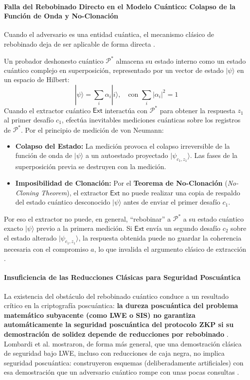 \paragraph{Falla del Rebobinado Directo en el Modelo Cuántico: Colapso de la Función de Onda y No-Clonación}
Cuando el adversario es una entidad cuántica, el mecanismo clásico de rebobinado deja de ser aplicable de forma directa \cite{liu2019revisiting}.

Un probador deshonesto cuántico $\mathcal{P}^*$ almacena su estado interno como un estado cuántico complejo en superposición, representado por un vector de estado $|\psi\rangle$ en un espacio de Hilbert:
\begin{equation}
|\psi\rangle = \sum_{i} \alpha_i |i\rangle, \quad \text{con } \sum_{i} |\alpha_i|^2 = 1
\end{equation}
Cuando el extractor cuántico $\mathsf{Ext}$ interactúa con $\mathcal{P}^*$ para obtener la respuesta $z_1$ al primer desafío $c_1$, efectúa inevitables mediciones cuánticas sobre los registros de $\mathcal{P}^*$. Por el principio de medición de von Neumann:
\begin{itemize}
    \item \textbf{Colapso del Estado:} La medición provoca el colapso irreversible de la función de onda de $|\psi\rangle$ a un autoestado proyectado $|\psi_{c_1, z_1}\rangle$. Las fases de la superposición previa se destruyen con la medición.
    \item \textbf{Imposibilidad de Clonación:} Por el \textbf{Teorema de No-Clonación} (\textit{No-Cloning Theorem}), el extractor $\mathsf{Ext}$ no puede realizar una copia de respaldo del estado cuántico desconocido $|\psi\rangle$ antes de enviar el primer desafío $c_1$.
\end{itemize}

Por eso el extractor no puede, en general, ``rebobinar'' a $\mathcal{P}^*$ a su estado cuántico exacto $|\psi\rangle$ previo a la primera medición. Si $\mathsf{Ext}$ envía un segundo desafío $c_2$ sobre el estado alterado $|\psi_{c_1, z_1}\rangle$, la respuesta obtenida puede no guardar la coherencia necesaria con el compromiso $a$, lo que invalida el argumento clásico de extracción \cite{liu2019revisiting}.

\paragraph{Insuficiencia de las Reducciones Clásicas para Seguridad Poscuántica}
La existencia del obstáculo del rebobinado cuántico conduce a un resultado crítico en la criptografía poscuántica: \textbf{la dureza poscuántica del problema matemático subyacente (como LWE o SIS) no garantiza automáticamente la seguridad poscuántica del protocolo ZKP si su demostración de solidez depende de reducciones por rebobinado} \cite{liu2019revisiting}. Lombardi et al. mostraron, de forma más general, que una demostración clásica de seguridad bajo LWE, incluso con reducciones de caja negra, no implica seguridad poscuántica: construyeron esquemas (deliberadamente artificiales) con esa demostración que un adversario cuántico rompe con unas pocas consultas \cite{lombardi2022postquantum}.

